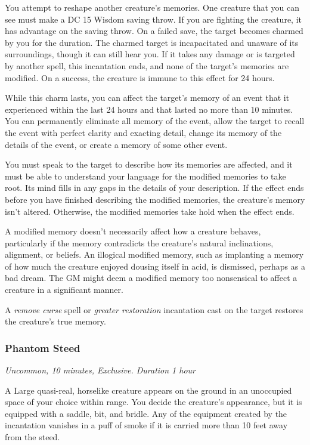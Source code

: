 You attempt to reshape another creature's memories. One creature that you can see must make a DC 15 Wisdom saving throw. If you are fighting the creature, it has advantage on the saving throw. On a failed save, the target becomes charmed by you for the duration. The charmed target is incapacitated and unaware of its surroundings, though it can still hear you. If it takes any damage or is targeted by another spell, this incantation ends, and none of the target's memories are modified. On a success, the creature is immune to this effect for 24 hours.

While this charm lasts, you can affect the target's memory of an event that it experienced within the last 24 hours and that lasted no more than 10 minutes. You can permanently eliminate all memory of the event, allow the target to recall the event with perfect clarity and exacting detail, change its memory of the details of the event, or create a memory of some other event.

You must speak to the target to describe how its memories are affected, and it must be able to understand your language for the modified memories to take root. Its mind fills in any gaps in the details of your description. If the effect ends before you have finished describing the modified memories, the creature's memory isn't altered. Otherwise, the modified memories take hold when the effect ends.

A modified memory doesn't necessarily affect how a creature behaves, particularly if the memory contradicts the creature's natural inclinations, alignment, or beliefs. An illogical modified memory, such as implanting a memory of how much the creature enjoyed dousing itself in acid, is dismissed, perhaps as a bad dream. The GM might deem a modified memory too nonsensical to affect a creature in a significant manner.

A \textit{remove curse} spell or \textit{greater restoration} incantation cast on the target restores the creature's true memory. 

\subsubsection{Phantom Steed}
\textit{Uncommon, 10 minutes, Exclusive. Duration 1 hour}

A Large quasi-real, horselike creature appears on the ground in an unoccupied space of your choice within range. You decide the creature's appearance, but it is equipped with a saddle, bit, and bridle. Any of the equipment created by the incantation vanishes in a puff of smoke if it is carried more than 10 feet away from the steed.


